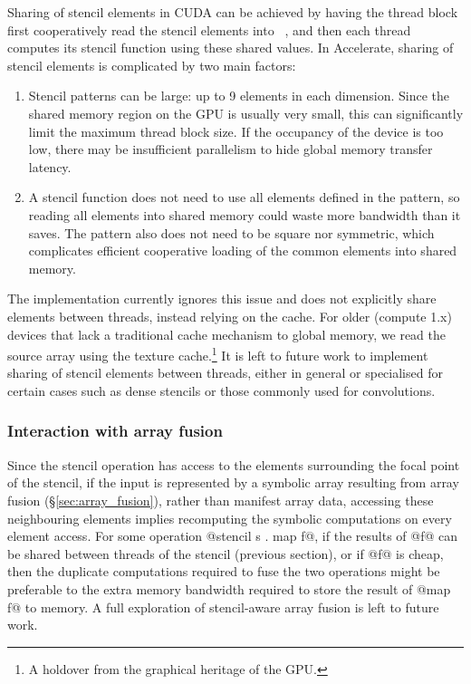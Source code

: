 Sharing of stencil elements in CUDA can be achieved by having the thread block
first cooperatively read the stencil elements into ~\cite{NVIDIA:2012wf}, and then each thread computes its stencil function
using these shared values. In Accelerate, sharing of stencil elements is
complicated by two main factors:
%
\begin{enumerate}
    \item Stencil patterns can be large: up to 9 elements in each dimension.
        Since the shared memory region on the GPU is usually very small, this
        can significantly limit the maximum thread block size. If the occupancy
        of the device is too low, there may be insufficient parallelism to hide
        global memory transfer latency.

    \item A stencil function does not need to use all elements defined in the
        pattern, so reading all elements into shared memory could waste more
        bandwidth than it saves. The pattern also does not need to be square nor
        symmetric, which complicates efficient cooperative loading of the
        common elements into shared memory.
\end{enumerate}

The implementation currently ignores this issue and does not explicitly share
elements between threads, instead relying on the cache. For older (compute 1.x)
devices that lack a traditional cache mechanism to global memory, we read the
source array using the texture cache.\footnote{A holdover from the graphical
heritage of the GPU.} It is left to future work to implement sharing of stencil
elements between threads, either in general or specialised for certain cases
such as dense stencils or those commonly used for convolutions.


\subsubsection{Interaction with array fusion}

Since the stencil operation has access to the elements surrounding the focal
point of the stencil, if the input is represented by a symbolic array resulting
from array fusion (\S\ref{sec:array_fusion}), rather than manifest array data,
accessing these neighbouring elements implies recomputing the symbolic
computations on every element access. For some operation @stencil s . map f@, if
the results of @f@ can be shared between threads of the stencil (previous
section), or if @f@ is cheap, then the duplicate computations required to fuse
the two operations might be preferable to the extra memory bandwidth required to
store the result of @map f@ to memory. A full exploration of stencil-aware array
fusion is left to future work.


